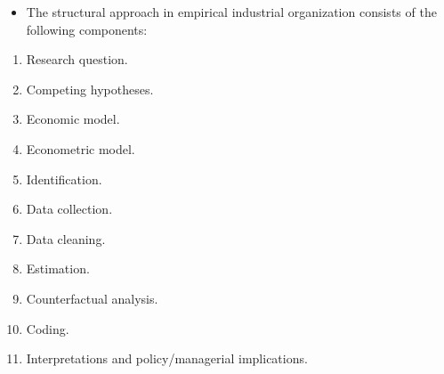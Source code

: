 \documentclass[
]{book}
\providecommand{\tightlist}{%
  \setlength{\itemsep}{0pt}\setlength{\parskip}{0pt}}
\begin{document}
\begin{itemize}
\tightlist
\item
  The structural approach in empirical industrial organization consists of the following components:
\end{itemize}

\begin{enumerate}
\def\labelenumi{\arabic{enumi}.}
\tightlist
\item
  Research question.
\item
  Competing hypotheses.
\item
  Economic model.
\item
  Econometric model.
\item
  Identification.
\item
  Data collection.
\item
  Data cleaning.
\item
  Estimation.
\item
  Counterfactual analysis.
\item
  Coding.
\item
  Interpretations and policy/managerial implications.
\end{enumerate}
\end{document}
